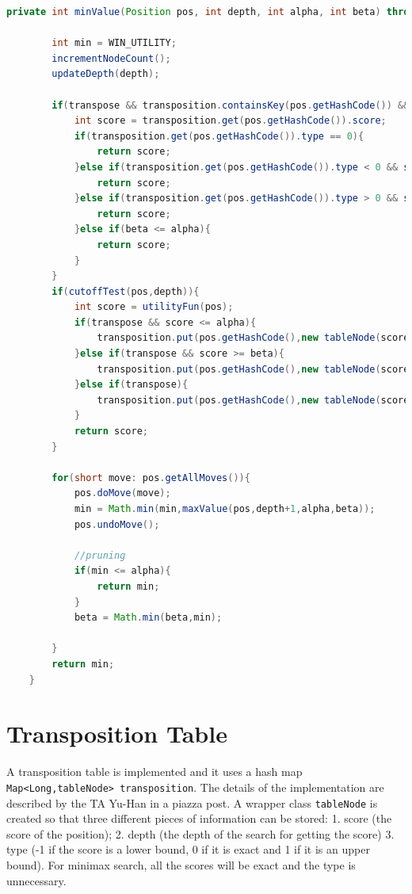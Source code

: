 \documentclass[9.5pt]{extarticle}
\begin{document}
\begin{lstlisting}[language=java,caption={Java code for minValue for alpha beta pruning algorithm}]
private int minValue(Position pos, int depth, int alpha, int beta) throws Exception {

        int min = WIN_UTILITY;
        incrementNodeCount();
        updateDepth(depth);

        if(transpose && transposition.containsKey(pos.getHashCode()) && transposition.get(pos.getHashCode()).depth > CURR_DEPTH){
            int score = transposition.get(pos.getHashCode()).score;
            if(transposition.get(pos.getHashCode()).type == 0){
                return score;
            }else if(transposition.get(pos.getHashCode()).type < 0 && score >= beta){
                return score;
            }else if(transposition.get(pos.getHashCode()).type > 0 && score <= alpha){
                return score;
            }else if(beta <= alpha){
                return score;
            }
        }
        if(cutoffTest(pos,depth)){
            int score = utilityFun(pos);
            if(transpose && score <= alpha){
                transposition.put(pos.getHashCode(),new tableNode(score,depth,1));
            }else if(transpose && score >= beta){
                transposition.put(pos.getHashCode(),new tableNode(score,depth,-1));
            }else if(transpose){
                transposition.put(pos.getHashCode(),new tableNode(score,depth,0));
            }
            return score;
        }

        for(short move: pos.getAllMoves()){
            pos.doMove(move);
            min = Math.min(min,maxValue(pos,depth+1,alpha,beta));
            pos.undoMove();

            //pruning
            if(min <= alpha){
                return min;
            }
            beta = Math.min(beta,min);

        }
        return min;
    }
\end{lstlisting}

\section{Transposition Table}

A transposition table is implemented and it uses a hash map \verb`Map<Long,tableNode> transposition`. The details of the implementation are described by the TA Yu-Han in a piazza post. A wrapper class \verb`tableNode` is created so that three different pieces of information can be stored: 1. score (the score of the position); 2. depth (the depth of the search for getting the score) 3. type (-1 if the score is a lower bound, 0 if it is exact and 1 if it is an upper bound). For minimax search, all the scores will be exact and the type is unnecessary. \\
\end{document}

